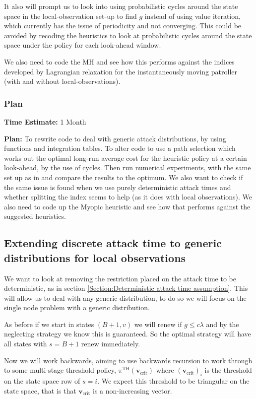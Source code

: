 \documentclass[a4paper,10pt]{article}
\theoremstyle{definition}
\theoremstyle{definition}
\theoremstyle{remark}
\theoremstyle{definition}
\begin{document}
It also will prompt us to look into using probabilistic cycles around the state space in the local-observation set-up to find $g$ instead of using value iteration, which currently has the issue of periodicity and not converging. This could be avoided by recoding the heuristics to look at probabilistic cycles around the state space under the policy for each look-ahead window.

We also need to code the MH and see how this performs against the indices developed by Lagrangian relaxation for the instantaneously moving patroller (with and without local-observations).

\subsubsection{Plan}
\textbf{Time Estimate:} 1 Month

\textbf{Plan:} To rewrite code to deal with generic attack distributions, by using functions and integration tables. To alter code to use a path selection which works out the optimal long-run average cost for the heuristic policy at a certain look-ahead, by the use of cycles. Then run numerical experiments, with the same set up as in \citep{Lin2013} and compare the results to the optimum. We also want to check if the same issue is found when we use purely deterministic attack times and whether splitting the index seems to help (as it does with local observations). We also need to code up the Myopic heuristic and see how that performs against the suggested heuristics.

\subsection{Extending discrete attack time to generic distributions for local observations}
We want to look at removing the restriction placed on the attack time to be deterministic, as in section \ref{Section:Deterministic attack time assumption}. This will allow us to deal with any generic distribution, to do so we will focus on the single node problem with a generic distribution.

As before if we start in states $(B+1,v)$ we will renew if $g \leq c \lambda$ and by the neglecting strategy we know this is guaranteed. So the optimal strategy will have all states with $s=B+1$ renew immediately.

Now we will work backwards, aiming to use backwards recursion to work through to some multi-stage threshold policy, $\pi^{\text{TH}}(\bm{v}_{\text{crit}})$ where $(\bm{v}_{\text{crit}})_{i}$ is the threshold on the state space row of $s=i$. We expect this threshold to be triangular on the state space, that is that $\bm{v}_{\text{crit}}$ is a non-increasing vector.
\end{document}
